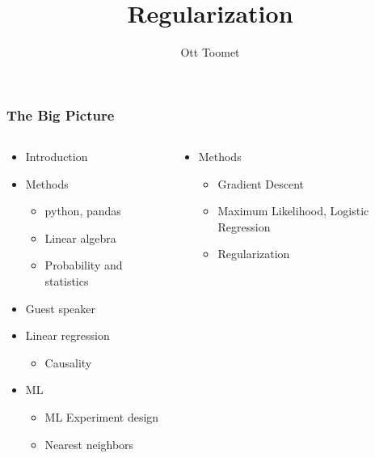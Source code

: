 \documentclass[mathserif, xcolor=table, svgnames]{beamer}
\title{Regularization}
\author{Ott Toomet}
\begin{document}

\begin{frame}
  \maketitle
\end{frame}

\begin{frame}
  \tableofcontents
\end{frame}

\begin{frame}
  \frametitle{The Big Picture}
  \begin{columns}
    \begin{column}{0.5\linewidth}
      \begin{itemize}
      \item Introduction
      \item Methods
        \begin{itemize}
        \item python, pandas
        \item Linear algebra
        \item Probability and statistics
        \end{itemize}
      \item Guest speaker
      \item Linear regression
        \begin{itemize}
        \item Causality
        \end{itemize}
      \item ML
        \begin{itemize}
        \item ML Experiment design
        \item Nearest neighbors
        \end{itemize}
      \end{itemize}
    \end{column}
    \begin{column}{0.5\linewidth}
      \begin{itemize}
      \item Methods
        \begin{itemize}
        \item Gradient Descent
        \item Maximum Likelihood, Logistic Regression
        \item \alert{Regularization}
        \end{itemize}

\end{itemize}
\end{column}
\end{columns}
\end{frame}
\end{document}
